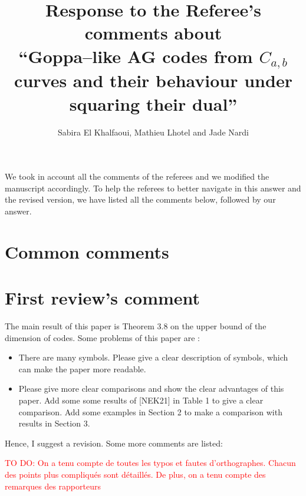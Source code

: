 \documentclass[12pt,a4paper]{amsart}
\title[Goppa--like AG codes from $C_{a,b}$ curves and their behaviour under squaring their dual]{Response to the Referee's comments about  \\ ``Goppa--like AG codes from $C_{a,b}$ curves and their behaviour under squaring their dual''}
\author{Sabira El Khalfaoui, Mathieu Lhotel and Jade Nardi}
\newcommand\TODO[1]{\textcolor{red}{TO DO: #1}}
\begin{document}
\maketitle
We took in account all the comments of the referees and we modified the manuscript accordingly. To help the referees to better navigate in this answer and the revised version, we have listed all the comments below, followed by our answer. 
\section*{Common comments}
 
\section*{First review's comment}

The main result of this paper is Theorem 3.8 on the upper bound of the dimension of codes. Some problems
of this paper are :
\begin{itemize}
\item  There are many symbols. Please give a clear description of symbols, which can make the paper more
readable.
\item  Please give more clear comparisons and show the clear advantages of this paper. Add some some
results of [NEK21] in Table 1 to give a clear comparison. Add some examples in Section 2 to make
a comparison with results in Section 3.
\end{itemize}

Hence, I suggest a revision. Some more comments are listed:


\TODO{On a tenu compte de toutes les typos et fautes d'orthographes. Chacun des points plus compliqués sont détaillés. De plus, on a tenu compte des remarques des rapporteurs}
\end{document}
